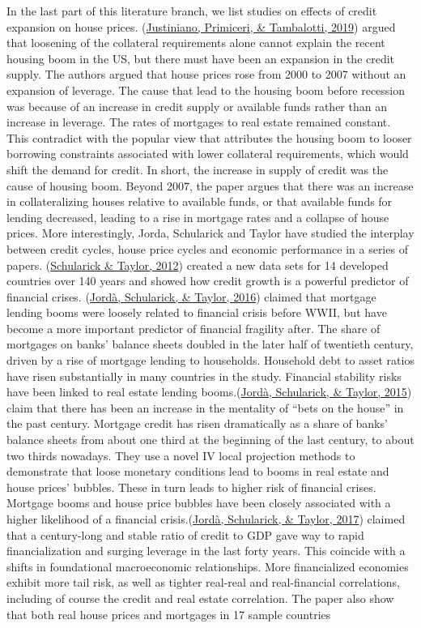 \documentclass[
  12pt,
]{article}
\begin{document}
In the last part of this literature branch, we list studies on effects of credit expansion on house prices. (\protect\hyperlink{ref-justiniano_credit_2019}{Justiniano, Primiceri, \& Tambalotti, 2019}) argued that loosening of the collateral requirements alone cannot explain the recent housing boom in the US, but there must have been an expansion in the credit supply. The authors argued that house prices rose from 2000 to 2007 without an expansion of leverage. The cause that lead to the housing boom before recession was because of an increase in credit supply or available funds rather than an increase in leverage. The rates of mortgages to real estate remained constant. This contradict with the popular view that attributes the housing boom to looser borrowing constraints associated with lower collateral requirements, which would shift the demand for credit. In short, the increase in supply of credit was the cause of housing boom. Beyond 2007, the paper argues that there was an increase in collateralizing houses relative to available funds, or that available funds for lending decreased, leading to a rise in mortgage rates and a collapse of house prices. More interestingly, Jorda, Schularick and Taylor have studied the interplay between credit cycles, house price cycles and economic performance in a series of papers. (\protect\hyperlink{ref-schularick_credit_2012}{Schularick \& Taylor, 2012}) created a new data sets for 14 developed countries over 140 years and showed how credit growth is a powerful predictor of financial crises. (\protect\hyperlink{ref-jorda_great_2016}{Jordà, Schularick, \& Taylor, 2016}) claimed that mortgage lending booms were loosely related to financial crisis before WWII, but have become a more important predictor of financial fragility after. The share of mortgages on banks' balance sheets doubled in the later half of twentieth century, driven by a rise of mortgage lending to households. Household debt to asset ratios have risen substantially in many countries in the study. Financial stability risks have been linked to real estate lending booms.(\protect\hyperlink{ref-jorda_betting_2015}{Jordà, Schularick, \& Taylor, 2015}) claim that there has been an increase in the mentality of ``bets on the house'' in the past century. Mortgage credit has risen dramatically as a share of banks' balance sheets from about one third at the beginning of the last century, to about two thirds nowadays. They use a novel IV local projection methods to demonstrate that loose monetary conditions lead to booms in real estate and house prices' bubbles. These in turn leads to higher risk of financial crises. Mortgage booms and house price bubbles have been closely associated with a higher likelihood of a financial crisis.(\protect\hyperlink{ref-jorda_macrofinancial_2017}{Jordà, Schularick, \& Taylor, 2017}) claimed that a century-long and stable ratio of credit to GDP gave way to rapid financialization and surging leverage in the last forty years. This coincide with a shifts in foundational macroeconomic relationships. More financialized economies exhibit more tail risk, as well as tighter real-real and real-financial correlations, including of course the credit and real estate correlation. The paper also show that both real house prices and mortgages in 17 sample countries 
\end{document}
